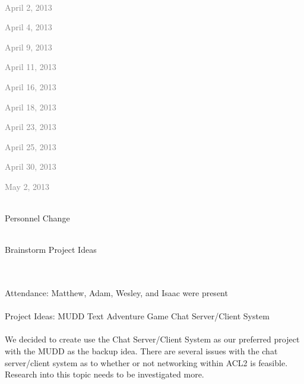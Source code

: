 \documentclass[11pt, letterpaper]{report}
\begin{document}
\begin{description}
\begin{itemize}
\\ \textcolor{gray}{
\item April 2, 2013 
\item April 4, 2013 
\item April 9, 2013 
\item April 11, 2013 
\item April 16, 2013 
\item April 18, 2013 
\item April 23, 2013 
\item April 25, 2013 
\item April 30, 2013 
\item May 2, 2013 }


\end{itemize}
\newpage

\setcounter{page}{1}

\item[\Large January 17, 2013]
\hypertarget{January 17, 2013} {}
\item[Old Business] \hfill \\
\subitem Personnel Change
\item[New Business] \hfill \\
\subitem Brainstorm Project Ideas
\item[Notes] \hfill \\ \hfill \\
Attendance: Matthew, Adam, Wesley, and Isaac were present \\ \\
Project Ideas: 
\subitem MUDD Text Adventure Game
\subitem Chat Server/Client System \\ \\
We decided to create use the Chat Server/Client System as our preferred project with the MUDD as the backup idea. There are several issues with the chat server/client system as to whether or not networking within ACL2 is feasible. Research into this topic needs to be investigated more.


\end{description}
\end{document}
